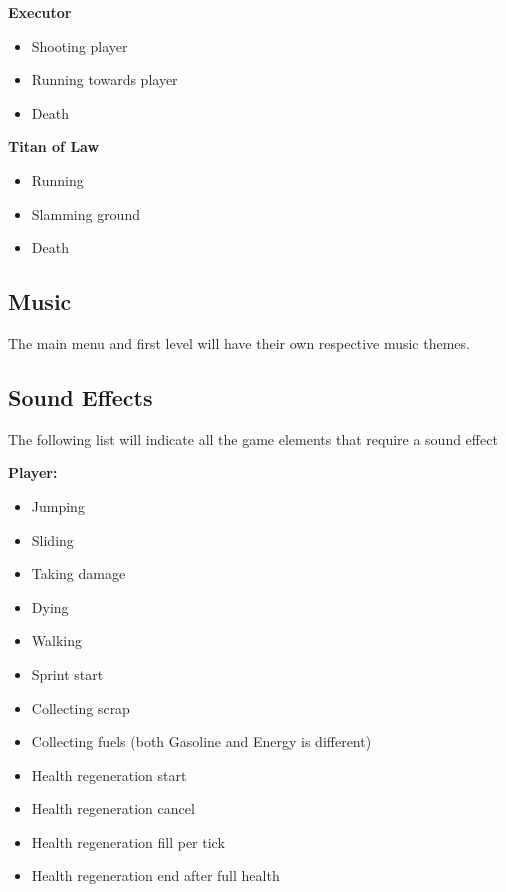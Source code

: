 \documentclass[../Main.tex]{subfiles}
\begin{document}
\textbf{Executor}
\begin{itemize}
	\item Shooting player
	\item Running towards player
	\item Death
\end{itemize}

\textbf{Titan of Law}
\begin{itemize}
	\item Running
	\item Slamming ground
	\item Death
\end{itemize}


\subsection{Music}

The main menu and first level will have their own respective music themes. 

\subsection{Sound Effects}

The following list will indicate all the game elements that require a sound effect\newline

\textbf{Player:}
\begin{itemize}
	\item Jumping
	\item Sliding
	\item Taking damage
	\item Dying
	\item Walking
	\item Sprint start
	\item Collecting scrap
	\item Collecting fuels (both Gasoline and Energy is different)
	\item Health regeneration start
	\item Health regeneration cancel
	\item Health regeneration fill per tick
	\item Health regeneration end after full health
\end{itemize}
\end{document}

